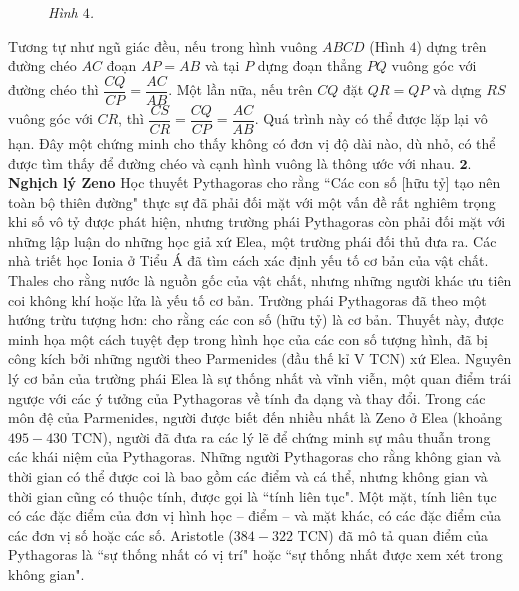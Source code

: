 \begin{multicols}{2}
\begin{figure}[H]
		\vspace*{-5pt}
		\caption{\small\textit{\color{lichsutoanhoc}Hình $4$.}}
		\vspace*{-10pt}
	\end{figure}
	Tương tự như ngũ giác đều, nếu trong hình vuông $ABCD$ (Hình $4$) dựng trên đường chéo $AC$ đoạn $AP = AB$  và tại $P$ dựng đoạn thẳng $PQ$  vuông góc với đường chéo thì $\dfrac{CQ}{CP} = \dfrac{AC}{AB}$. Một lần nữa, nếu trên $CQ$  đặt $QR = QP$ và  dựng $RS$  vuông góc với $CR$,  thì  $\dfrac{CS}{CR} = \dfrac{CQ}{CP} = \dfrac{AC}{AB}$. Quá trình này có thể được lặp lại vô hạn. Đây một chứng minh cho thấy không có đơn vị độ dài nào, dù nhỏ, có thể được tìm thấy để đường chéo và cạnh hình vuông là thông ước với nhau.
	\vskip 0.1cm
	\vskip 0.1cm
	$\pmb{2.}$ \textbf{\color{lichsutoanhoc}Nghịch lý Zeno}
	\vskip 0.1cm
	Học thuyết Pythagoras cho rằng ``Các con số [hữu tỷ] tạo nên toàn bộ thiên đường" thực sự đã phải đối mặt với một vấn đề rất nghiêm trọng khi số vô tỷ được phát hiện, nhưng trường phái Pythagoras còn phải đối mặt với những lập luận do những học giả xứ Elea, một trường phái đối thủ đưa ra. 
	\vskip 0.1cm
	Các nhà triết học Ionia ở Tiểu Á đã tìm cách xác định yếu tố cơ bản của vật chất.
	\vskip 0.1cm
	Thales cho rằng nước là nguồn gốc của vật chất, nhưng những người khác ưu tiên coi không khí hoặc lửa là yếu tố cơ bản. Trường phái Pythagoras đã theo một hướng trừu tượng hơn: cho rằng các con số (hữu tỷ) là cơ bản. Thuyết này, được minh họa một cách tuyệt đẹp trong hình học của các con số tượng hình, đã bị công kích bởi những người theo Parmenides (đầu thế kỉ V TCN) xứ Elea. Nguyên lý cơ bản của trường phái Elea là sự thống nhất và vĩnh viễn, một quan điểm trái ngược với các ý tưởng của Pythagoras về tính đa dạng và thay đổi.  Trong các môn đệ của Parmenides, người được biết đến nhiều nhất là Zeno ở Elea (khoảng $495-430$ TCN), người đã đưa ra các lý lẽ để chứng minh sự mâu thuẫn trong các khái niệm của Pythagoras.
	\vskip 0.1cm
	Những người Pythagoras cho rằng không gian và thời gian có thể được coi là bao gồm các điểm và cá thể, nhưng không gian và thời gian cũng có thuộc tính, được gọi là ``tính liên tục". 
	Một mặt, tính liên tục có các đặc điểm của đơn vị hình học -- điểm -- và mặt khác, có các đặc điểm của các đơn vị số hoặc các số.
	Aristotle ($384-322$ TCN) đã mô tả quan điểm của Pythagoras là ``sự thống nhất có vị trí" hoặc ``sự thống nhất được xem xét trong không gian". 

\end{multicols}
